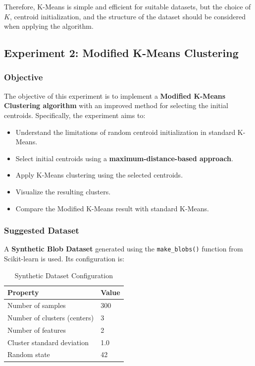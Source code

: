 \documentclass[a4paper,11pt]{article}
\begin{document}
Therefore, K-Means is simple and efficient for suitable datasets, but the choice of $K$, centroid initialization, and the structure of the dataset should be considered when applying the algorithm.

\subsection{Experiment 2: Modified K-Means Clustering}

\subsubsection{Objective}
The objective of this experiment is to implement a \textbf{Modified K-Means Clustering algorithm} with an improved method for selecting the initial centroids. Specifically, the experiment aims to:
\begin{itemize}
    \item Understand the limitations of random centroid initialization in standard K-Means.
    \item Select initial centroids using a \textbf{maximum-distance-based approach}.
    \item Apply K-Means clustering using the selected centroids.
    \item Visualize the resulting clusters.
    \item Compare the Modified K-Means result with standard K-Means.
\end{itemize}

\subsubsection{Suggested Dataset}
A \textbf{Synthetic Blob Dataset} generated using the \texttt{make\_blobs()} function from Scikit-learn is used. Its configuration is:

\begin{table}[H]
\centering
\caption{Synthetic Dataset Configuration}
\begin{tabular}{ll}
\toprule
\textbf{Property} & \textbf{Value} \\
\midrule
Number of samples            & 300 \\
Number of clusters (centers) & 3 \\
Number of features           & 2 \\
Cluster standard deviation   & 1.0 \\
Random state                 & 42 \\
\bottomrule
\end{tabular}
\end{table}
\end{document}

